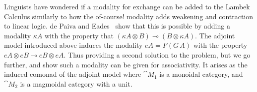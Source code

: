Linguists have wondered if a modality for exchange can be added to the
Lambek Calculus similarly to how the of-course! modality adds
weakening and contraction to linear logic.  de Paiva and
Eades~\cite{?} show that this is possible by adding a modality $\kappa
A$ with the property that $(\kappa A \otimes B) \multimap (B \otimes
\kappa A)$.  The adjoint model introduced above induces the modality
$eA = F(G\,A)$ with the property $eA \otimes eB \multimap eB \otimes
eA$.  Thus providing a second solution to the problem, but we go
further, and show such a modality can be given for associativity. It
arises as the induced comonad of the adjoint model where $\cat{M}_1$
is a monoidal category, and $\cat{M}_2$ is a magmoidal category with a
unit.

